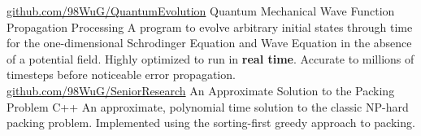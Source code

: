 \begin{cventries}
    \cventry
	{\href{https://github.com/98WuG/QuantumEvolution}{github.com/98WuG/QuantumEvolution}}
	{Quantum Mechanical Wave Function Propagation}
	{Processing}
	{}
    {
		A program to evolve arbitrary initial states through time for the one-dimensional Schrodinger Equation and Wave Equation in the absence of a potential field. Highly optimized to run in \textbf{real time}. Accurate to millions of timesteps before noticeable error propagation.
    }
    \cventry
	{\href{https://github.com/98WuG/SeniorResearch}{github.com/98WuG/SeniorResearch}}
	{An Approximate Solution to the Packing Problem}
	{C++}
	{}
    {
		An approximate, polynomial time solution to the classic NP-hard packing problem. Implemented using the sorting-first greedy approach to packing.
    }
\end{cventries}
